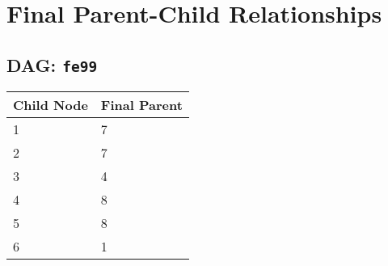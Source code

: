 \documentclass{article}
\begin{document}
\pagestyle{fancy}
\fancyhf{}
\section*{Final Parent-Child Relationships}
\subsection*{DAG: \texttt{fe99}}
\begin{tabular}{ll}
\toprule
\textbf{Child Node} & \textbf{Final Parent} \\
\midrule
1 & 7 \\
2 & 7 \\
3 & 4 \\
4 & 8 \\
5 & 8 \\
6 & 1 \\
\bottomrule
\end{tabular}
\end{document}
